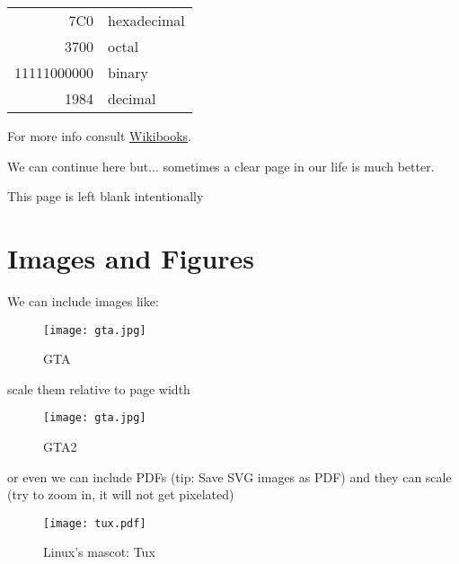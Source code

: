 \documentclass[a4paper, 12pt, titlepage]{article}
\begin{document}

\begin{table}[H]
	\begin{flushright}
		\begin{tabular}{|r|l|}
			\hline
			7C0 & hexadecimal \\
			3700 & octal \\ \cline{2-2}
			11111000000 & binary \\
			\hline \hline
			1984 & decimal \\
			\hline
		\end{tabular}
	\end{flushright}
\end{table}

For more info consult \href{https://en.wikibooks.org/wiki/LaTeX/Tables}{Wikibooks}.

We can continue here but... \newpage
sometimes a clear page in our life is much better.

\vspace{150pt}

{\LARGE This page is left blank intentionally} \\


\newpage

\section{Images and Figures}

We can include images like:

\begin{figure}[H]
	\centering
	\caption{GTA}
	\label{fig:gta}
	\texttt{[image: gta.jpg]}
\end{figure}

scale them relative to page width

\begin{figure}[H]
	\centering
	\caption{GTA2}
	\label{fig:gta2}
	\texttt{[image: gta.jpg]} %
\end{figure}

or even we can include PDFs (tip: Save SVG images as PDF) and they can scale (try to zoom in, it will not get pixelated)

\begin{figure}[H]
	\centering
	\caption{Linux's mascot: Tux}
	\label{fig:tux}
	\texttt{[image: tux.pdf]} %
\end{figure}
\end{document}
